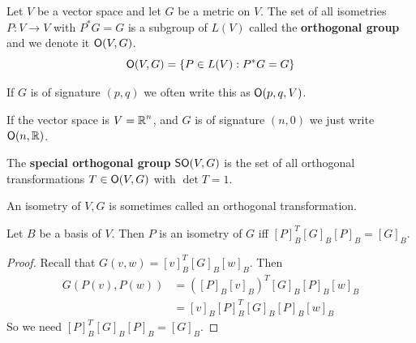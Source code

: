 \begin{defn} Let $V$ be a vector space and let $G$ be a metric on $V$. The set of all isometries $P : V\to V$ with $P^* G = G$ is a subgroup of $L(V)$ called the \textbf{orthogonal group} and we denote it $\operatorname{\textsf{O}}(V,G)$. 
\begin{equation}
    \operatorname{\textsf{O}}(V,G) = \{P \in L(V): P^* G= G\}
\end{equation}
\end{defn}
\begin{remark*}
    If $G$ is of signature $(p,q)$ we often write this as $\operatorname{\textsf{O}}(p,q,V)$.

    If the vector space is $V=\operatorname{\mathbb{R}}^n$, and $G$ is of signature $(n,0)$ we just write $\operatorname{\textsf{O}}(n,\operatorname{\mathbb{R}})$.
\end{remark*}
\begin{defn}
The \textbf{special orthogonal group} $\operatorname{\textsf{SO}}(V,G)$ is the set of all orthogonal transformations $T\in \operatorname{\textsf{O}}(V,G)$ with $\det T = 1$.
\end{defn}
\begin{remark*}
An isometry of $V,G$ is sometimes called an orthogonal transformation.
\end{remark*}
\begin{lemma}
    Let $B$ be a basis of $V$. Then $P$ is an isometry of $G$ iff $[P]_B^T[G]_B[P]_B = [G]_B$.
\end{lemma}
\begin{proof}
    Recall that $G(v,w) = [v]_B^T [G]_B[w]_B$. Then \begin{align*}G(P(v),P(w)) &= ([P]_B[v]_B)^T[G]_B[P]_B[w]_B \\&= [v]_B[P]_B^T[G]_B[P]_B[w]_B\end{align*}
    So we need $[P]_B^T[G]_B[P]_B = [G]_B$.
\end{proof}
